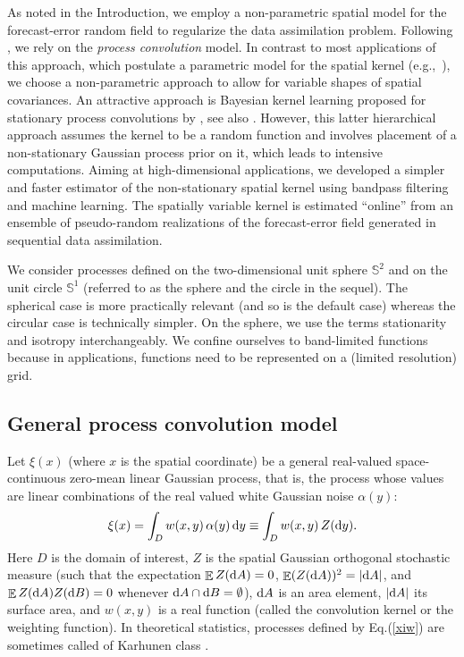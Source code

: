 \documentclass[12pt]{article}
\DeclareMathOperator{\Ex}{\mathbb{E}}
\renewcommand{\S}{{\mathbb S}}
\renewcommand{\d}{{\rm d}}
\newcommand{\eg}{e.g.,\ }
\begin{document}
As noted in the Introduction, we employ a non-parametric spatial model for the 
forecast-error random field to regularize the data assimilation problem.
Following  \citep{Higdon}, we rely on the {\em process convolution} model.
In contrast to most applications of this approach, which postulate
a parametric model for the spatial kernel (\eg \citet{Sanso2009,Bhat,Katzfuss,Li}), we
choose a non-parametric approach to allow for variable shapes of spatial covariances.
An attractive approach is Bayesian kernel learning
proposed for stationary process convolutions by  \citet{Tobar2015}, see also \citet{Bruinsma2022}.
However, this latter hierarchical approach assumes the kernel to be a random function and
involves placement of a non-stationary Gaussian  process prior
on it, which leads to intensive computations. 
Aiming at high-dimensional applications,
we developed a simpler and faster estimator of the non-stationary spatial kernel
using bandpass filtering and machine learning.
The spatially variable kernel is estimated ``online'' from an ensemble of pseudo-random realizations
of the forecast-error field
generated in sequential data assimilation. 

We consider processes defined on the two-dimensional unit sphere $\S^2$ and on the unit circle $\S^1$
(referred to as the sphere and the  circle in the sequel).
The spherical case is more practically relevant (and so is the default case) whereas the circular case is
technically simpler.
On the sphere, we use the terms stationarity and isotropy interchangeably.
We confine ourselves to band-limited functions because in applications, functions need to be 
represented on a (limited resolution) grid.






\subsection {General process convolution model}
\label{sec_conv_gen}





Let $\xi(x)$ (where $x$ is the spatial coordinate) be a general real-valued space-continuous zero-mean linear Gaussian process,
that is, the process whose values are  linear combinations of the  real valued 
white Gaussian noise $\alpha(y)$:
%
\begin {equation}
\label{xiw}
\xi(x) = \int_{D} w(x, y) \,\alpha(y) \,\d y \equiv 
          \int_{D} w(x, y) \,Z(\d y).
\end {equation}
%
Here 
$D$ is the domain of interest,
$Z$ is the spatial Gaussian orthogonal stochastic measure 
(such that the expectation $\Ex Z(\d A)=0$, $\Ex (Z(\d A))^2=|\d A|$, and 
$\Ex Z(\d A) Z(\d B)=0$ whenever $\d A \cap \d B =\emptyset$),  
$\d A$ is an area element, $|\d A|$ its surface area, and
$w(x, y)$ is a real function (called the convolution kernel or the weighting function).
In theoretical statistics, processes defined by Eq.(\ref{xiw}) are sometimes called
of Karhunen class \citep{Kakihara}. 
\end{document}
